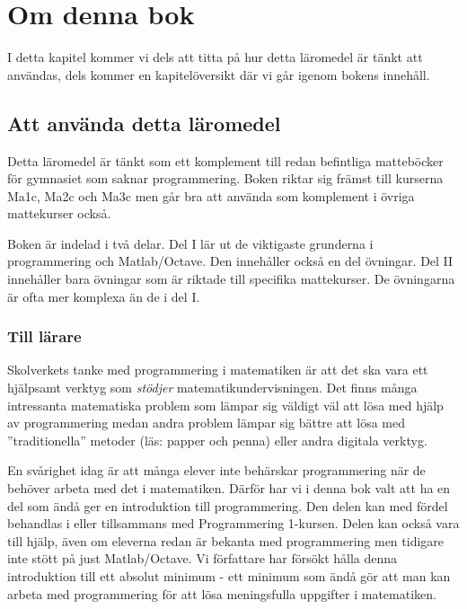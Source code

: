 %
%

\chapter{Om denna bok}\label{ch:ombok}
I detta kapitel kommer vi dels att titta på hur detta läromedel är tänkt att användas, dels kommer en kapitelöversikt där vi går igenom bokens innehåll.

\section{Att använda detta läromedel}
Detta läromedel är tänkt som ett komplement till redan befintliga matteböcker för gymnasiet som saknar programmering. Boken riktar sig främst till kurserna Ma1c, Ma2c och Ma3c men går bra att använda som komplement i övriga mattekurser också.

Boken är indelad i två delar. Del I lär ut de viktigaste grunderna i programmering och Matlab/Octave. Den innehåller också en del övningar. Del II innehåller bara övningar som är riktade till specifika mattekurser. De övningarna är ofta mer komplexa än de i del I.

\subsection{Till lärare}
Skolverkets tanke med programmering i matematiken är att det ska vara ett hjälpsamt verktyg som \emph{stödjer} matematikundervisningen. Det finns många intressanta matematiska problem som lämpar sig väldigt väl att lösa med hjälp av programmering medan andra problem lämpar sig bättre att lösa med ''traditionella'' metoder (läs: papper och penna) eller andra digitala verktyg.

En svårighet idag är att många elever inte behärskar programmering när de behöver arbeta med det i matematiken. Därför har vi i denna bok valt att ha en del som ändå ger en introduktion till programmering. Den delen kan med fördel behandlas i eller tillsammans med Programmering 1-kursen. Delen kan också vara till hjälp, även om eleverna redan är bekanta med programmering men tidigare inte stött på just Matlab/Octave. Vi författare har försökt hålla denna introduktion till ett absolut minimum - ett minimum som ändå gör att man kan arbeta med programmering för att lösa meningsfulla uppgifter i matematiken.

